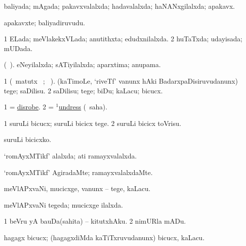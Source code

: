 \bentry
{} 
\gl{\gu}
\expl{}
\bmng
baliyada; mAgada; pakavxvalalxda; hadavalalxda; haNANxgilalxda; apakavx. 
\emng
\eentry

\bentry
{} 
\gl{\nA}
\expl{}
\bmng
apakavxte; baliyadiruvudu. 
\emng
\eentry

\bentry
{} 
\gl{\gu}
\expl{}
\bmng
\bnum
\num{1} ELada; meVlakekxVLada; anutithxta; edudxnilalxda. 
\num{2} huTaTxda; udayisada; mUDada. 
\enum
\emng
\eentry

\bentry
{} 
\gl{\gu}
\expl{}
\bmng
(\ame\ ). eNeyilalxda; sATiyilalxda; aparxtima; anupama. 
\emng
\eentry

\bentry
{} 
\gl{\sakirx}
\expl{}
\bmng
\bnum
\num{1} (\BU\ matutx \BUkaq\ ; \vakaq\ ). (kaTimoLe, `riveTf' \mo vanunx hAki BadarxpaDisiruvudanunx) tege; saDilisu. 
\num{2} saDilisu; tege; biDu; kaLacu; bicucx. 
\enum
\emng
\eentry

\bentry
{} 
\gl{\sakirx}
\expl{}
\bmng
\bnum
\num{1} = \hyperref{kandict_d.pdf}{D}{disrobe}{disrobe}. 
\num{2} = \hyperlink{undress(1)}{$^1$undress} (\akirx\ saha). 
\enum
\emng
\eentry

\bentry
{} 
\gl{\sakirx}
\expl{}
\bmng
\bnum
\num{1} suruLi bicucx; suruLi bicicx tege. 
\num{2} suruLi bicicx toVrisu. 
\enum
\emng

\noindent 
\gl{\akirx}
\expl{}
\bmng
suruLi bicicxko. 
\emng
\eentry

\bentry
{} 
\gl{\gu}
\expl{}
\bmng
`romAyxMTikf' alalxda; ati ramayxvalalxda. 
\emng
\eentry

\bentry
{} 
\gl{\kirxvi}
\expl{}
\bmng
`romAyxMTikf' AgiradaMte; ramayxvalalxdaMte. 
\emng
\eentry

\bentry
{} 
\gl{\akirx}
\expl{}
\bmng
meVlAPxvaNi, mucicxge, \mo vanunx -- tege, kaLacu. 
\emng
\eentry

\bentry
{} 
\gl{\gu}
\expl{}
\bmng
meVlAPxvaNi tegeda; mucicxge ilalxda. 
\emng
\eentry

\bentry
{} 
\gl{\sakirx}
\expl{}
\bmng
\bnum
\num{1} beVru yA bauDa(sahita) -- kitutxhAku. 
\num{2} nimURla mADu. 
\enum
\emng
\eentry

\bentry
{} 
\gl{\akirx}
\expl{}
\bmng
hagagx bicucx; (hagagxdiMda kaTiTxruvudanunx) bicucx, kaLacu. 
\emng

